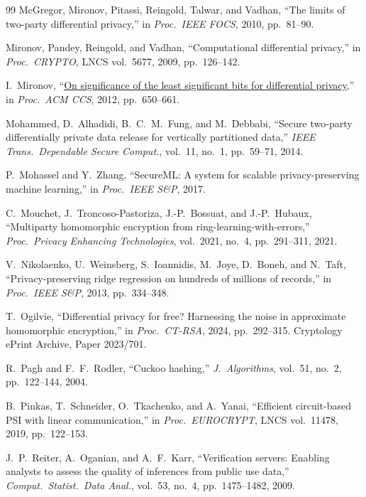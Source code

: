 \documentclass[11pt]{article}
\theoremstyle{definition}
\theoremstyle{plain}
\begin{document}
\begin{thebibliography}{99}
McGregor, Mironov, Pitassi, Reingold, Talwar, and Vadhan,
``The limits of two-party differential privacy,''
in \textit{Proc.\ IEEE FOCS}, 2010, pp.\ 81--90.

Mironov, Pandey, Reingold, and Vadhan,
``Computational differential privacy,''
in \textit{Proc.\ CRYPTO}, LNCS vol.~5677, 2009, pp.\ 126--142.

I.~Mironov,
``\href{https://dl.acm.org/doi/10.1145/2382196.2382264}{On significance of the least significant bits for differential privacy},''
in \textit{Proc.\ ACM CCS}, 2012, pp.\ 650--661.

Mohammed, D.~Alhadidi, B.~C.~M.~Fung, and M.~Debbabi,
``Secure two-party differentially private data release for vertically partitioned data,''
\textit{IEEE Trans.\ Dependable Secure Comput.}, vol.~11, no.~1, pp.\ 59--71, 2014.

P.~Mohassel and Y.~Zhang,
``SecureML: A system for scalable privacy-preserving machine learning,''
in \textit{Proc.\ IEEE S\&P}, 2017.

C.~Mouchet, J.~Troncoso-Pastoriza, J.-P.~Bossuat, and J.-P.~Hubaux,
``Multiparty homomorphic encryption from ring-learning-with-errors,''
\textit{Proc.\ Privacy Enhancing Technologies}, vol.~2021, no.~4, pp.\ 291--311, 2021.

V.~Nikolaenko, U.~Weinsberg, S.~Ioannidis, M.~Joye, D.~Boneh, and N.~Taft,
``Privacy-preserving ridge regression on hundreds of millions of records,''
in \textit{Proc.\ IEEE S\&P}, 2013, pp.\ 334--348.

T.~Ogilvie,
``Differential privacy for free? Harnessing the noise in approximate homomorphic encryption,''
in \textit{Proc.\ CT-RSA}, 2024, pp.\ 292--315. Cryptology ePrint Archive, Paper 2023/701.

R.~Pagh and F.~F.~Rodler,
``Cuckoo hashing,''
\textit{J.\ Algorithms}, vol.~51, no.~2, pp.\ 122--144, 2004.

B.~Pinkas, T.~Schneider, O.~Tkachenko, and A.~Yanai,
``Efficient circuit-based PSI with linear communication,''
in \textit{Proc.\ EUROCRYPT}, LNCS vol.~11478, 2019, pp.\ 122--153.

J.~P.~Reiter, A.~Oganian, and A.~F.~Karr,
``Verification servers: Enabling analysts to assess the quality of inferences from public use data,''
\textit{Comput.\ Statist.\ Data Anal.}, vol.~53, no.~4, pp.\ 1475--1482, 2009.


\end{thebibliography}
\end{document}
